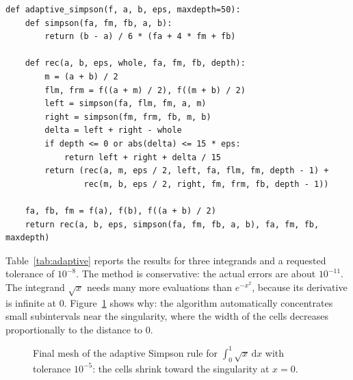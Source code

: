 \documentclass[11pt,a4paper,twoside,openright]{book}
\newcommand{\dd}{\,\mathrm{d}}
\begin{document}
\begin{lstlisting}
def adaptive_simpson(f, a, b, eps, maxdepth=50):
    def simpson(fa, fm, fb, a, b):
        return (b - a) / 6 * (fa + 4 * fm + fb)

    def rec(a, b, eps, whole, fa, fm, fb, depth):
        m = (a + b) / 2
        flm, frm = f((a + m) / 2), f((m + b) / 2)
        left = simpson(fa, flm, fm, a, m)
        right = simpson(fm, frm, fb, m, b)
        delta = left + right - whole
        if depth <= 0 or abs(delta) <= 15 * eps:
            return left + right + delta / 15
        return (rec(a, m, eps / 2, left, fa, flm, fm, depth - 1) +
                rec(m, b, eps / 2, right, fm, frm, fb, depth - 1))

    fa, fb, fm = f(a), f(b), f((a + b) / 2)
    return rec(a, b, eps, simpson(fa, fm, fb, a, b), fa, fm, fb, maxdepth)
\end{lstlisting}

Table~\ref{tab:adaptive} reports the results for three integrands and a requested tolerance of $10^{-8}$.
The method is conservative: the actual errors are about $10^{-11}$.
The integrand $\sqrt{x}$ needs many more evaluations than $e^{-x^{2}}$, because its derivative is infinite at $0$.
Figure~\ref{fig:mesh} shows why: the algorithm automatically concentrates small subintervals near the singularity, where the width of the cells decreases proportionally to the distance to $0$.

\begin{table}[htbp]
  \centering
  \caption{Adaptive Simpson quadrature with tolerance $10^{-8}$.}
  \label{tab:adaptive}
  
\end{table}

\begin{figure}[htbp]
  \centering
  \caption{Final mesh of the adaptive Simpson rule for $\int_0^1\sqrt{x}\dd x$ with tolerance $10^{-5}$: the cells shrink toward the singularity at $x=0$.}
  \label{fig:mesh}
\end{figure}
\end{document}
